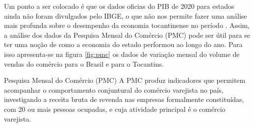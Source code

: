 \par Um ponto a ser colocado é que os dados oficias do PIB de 2020 para estados ainda não foram divulgados pelo IBGE, o que não nos permite fazer uma análise mais profunda sobre o desempenho da economia tocantinense no período . Assim, a análise dos dados da Pesquisa Mensal do Comércio (PMC) pode ser útil para se ter uma noção de como a economia do estado performou ao longo do ano. Para isso apresenta-se na figura \ref{fig:pmc} os dados de variação mensal do volume de vendas do comércio para o Brasil e para o Tocantins.

 \begin{smbox}[label={labelbox},nameref={Pesquisa Mensal do Comércio(PMC)}]{Pesquisa Mensal do Comércio (PMC)}
	A PMC produz indicadores que permitem acompanhar o comportamento conjuntural do comércio varejista no país, investigando a receita bruta de revenda nas empresas formalmente constituídas, com 20 ou mais pessoas ocupadas, e cuja atividade principal é o comércio varejista.
 \end{smbox}

